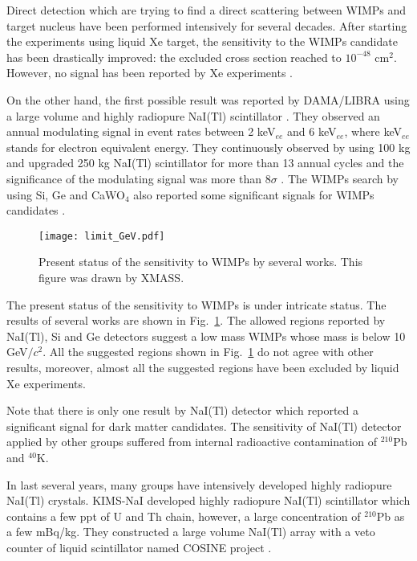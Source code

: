 \documentclass{jpsj-suppl} %
\begin{document}
Direct detection which are trying to find a direct scattering between WIMPs and target nucleus
have been performed intensively for several decades.
After starting the experiments using liquid Xe target, the sensitivity to the WIMPs candidate has 
been drastically improved: the excluded cross section reached to $10^{-48}$ cm$^{2}$.
However, no signal has been reported by Xe experiments
\cite{LUX, XENON100, XMASS, XMASS_annual}.


On the other hand,
the first possible result was reported by DAMA/LIBRA using a large volume and 
highly radiopure NaI(Tl) scintillator \cite{DAMA_1998}.
They observed an annual modulating signal in event rates between 2 keV$_{ee}$ and 
6 keV$_{ee}$, where keV$_{ee}$ stands for electron equivalent energy.
They continuously observed by using 100 kg and upgraded 250 kg NaI(Tl) scintillator
for more than 13 annual cycles and the significance of the modulating signal was
more than $8\sigma$ \cite{DAMA_EPJ}.
The WIMPs search by using Si, Ge and CaWO$_{4}$ also reported some significant signals for 
WIMPs candidates \cite{CDMS-Si, CoGeNT, CRESST}.

\begin{figure}[ht]
\centering
\texttt{[image: limit\_GeV.pdf]}
\caption{Present status of the sensitivity to WIMPs by several works. 
This figure was drawn by XMASS\cite{XMASS_annual}.}
\label{fg:limit_GeV}
\end{figure}
The present status of the sensitivity to WIMPs is under intricate status.
The results of several works are shown in Fig.~\ref{fg:limit_GeV}.
The allowed regions reported by NaI(Tl), Si and Ge detectors suggest a low mass 
WIMPs whose mass is below 10 GeV$/c^{2}$.
All the suggested regions shown in Fig.~\ref{fg:limit_GeV} do not agree with other 
results, moreover, 
almost all the suggested regions have been excluded by liquid Xe experiments.

Note that there is only one result by NaI(Tl) detector which reported a significant signal 
for dark matter candidates. 
The sensitivity of NaI(Tl) detector applied by other groups suffered from internal radioactive 
contamination of $^{210}$Pb and $^{40}$K.\@

In last several years, many groups have intensively developed highly radiopure NaI(Tl) crystals.
KIMS-NaI developed highly radiopure NaI(Tl) scintillator which contains a few ppt of 
U and Th chain, however, a large concentration of $^{210}$Pb as a few mBq/kg\cite{KIMS}.
They constructed a large volume NaI(Tl) array with a veto counter of liquid scintillator 
named COSINE project \cite{COSINE}.
\end{document}
